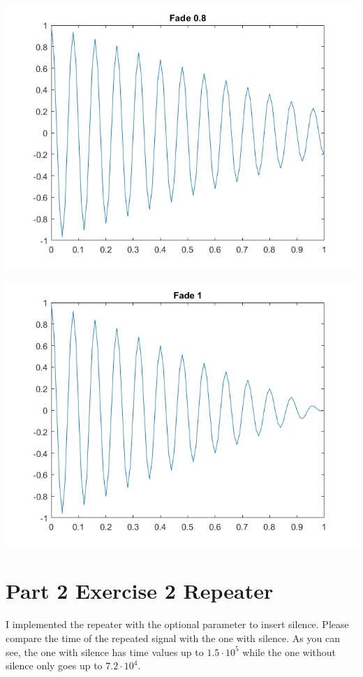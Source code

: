 \documentclass[11pt]{article}
\begin{document}
\includegraphics[scale=0.7]{fade0.8.png}

\includegraphics[scale=0.7]{fade1.png}

\pagebreak 
\section{Part 2 Exercise 2 Repeater}

I implemented the repeater with the optional parameter to insert silence. Please compare the time of the repeated signal with the one with silence. As you can see, the one with silence has time values up to $1.5\cdot10^{5}$ while the one without silence only goes up to $7.2\cdot10^{4}$.
\end{document}
